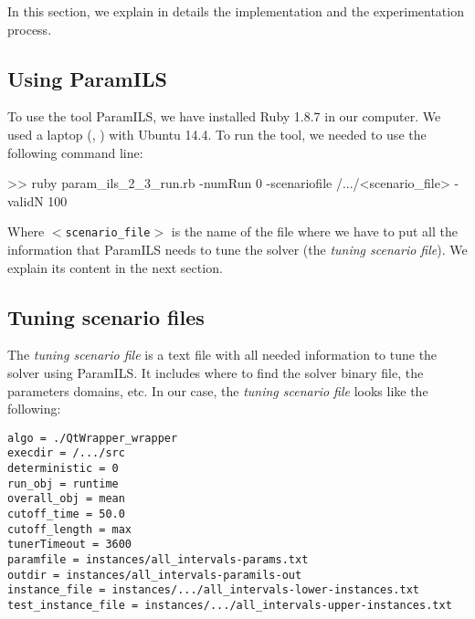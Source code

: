 In this section, we explain in details the implementation and the experimentation process.

\subsection{Using ParamILS}

To use the tool {\sc ParamILS}, we have installed Ruby 1.8.7 in our computer. We used a laptop \mylaptopName (\mylaptopProc, \mylaptopMemo) with {\sc Ubuntu 14.4}. To run the tool, we needed to use the following command line:

\begin{BGVerbatim}
>> ruby param_ils_2_3_run.rb -numRun 0 -scenariofile /.../<scenario_file> -validN 100
\end{BGVerbatim}

Where \texttt{$<$scenario\_file$>$} is the name of the file where we have to put all the information that {\sc ParamILS} needs to tune the solver (the \textit{tuning scenario file}). We explain its content in the next section.

\subsection{Tuning scenario files}

The {\it tuning scenario file} is a text file with all needed information to tune the solver using {\sc ParamILS}. It includes where to find the solver binary file, the parameters domains, etc. In our case, the {\it tuning scenario file} looks like the following:

\begin{shadedbox}
	\texttt{algo = ./QtWrapper\_wrapper\\
		execdir = /.../src \\
		deterministic = 0 \\
		run\_obj = runtime \\
		overall\_obj = mean \\
		cutoff\_time = 50.0 \\
		cutoff\_length = max \\
		tunerTimeout = 3600 \\
		paramfile = instances/all\_intervals-params.txt \\
		outdir = instances/all\_intervals-paramils-out \\
		instance\_file = instances/.../all\_intervals-lower-instances.txt \\
		test\_instance\_file = instances/.../all\_intervals-upper-instances.txt \\
	}
\end{shadedbox}

